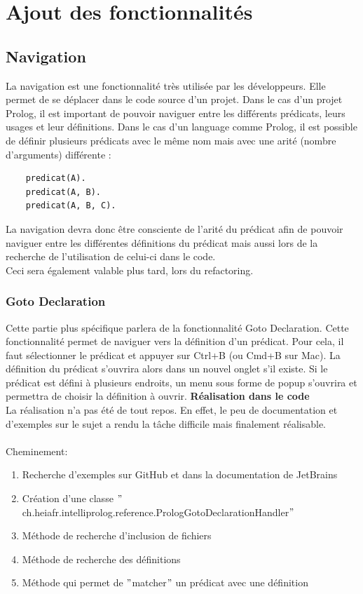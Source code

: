 \chapter{Ajout des fonctionnalités}


\section{Navigation}
\noindent La navigation est une fonctionnalité très utilisée par les développeurs.
Elle permet de se déplacer dans le code source d'un projet.
Dans le cas d'un projet Prolog, il est important de pouvoir naviguer entre les différents prédicats, leurs usages et leur définitions.
\newdoubleline
Dans le cas d'un language comme Prolog, il est possible de définir plusieurs prédicats avec le même nom mais avec une arité (nombre d'arguments) différente :

\begin{lstlisting}
    predicat(A).
    predicat(A, B).
    predicat(A, B, C).
\end{lstlisting}

La navigation devra donc être consciente de l'arité du prédicat afin de pouvoir naviguer entre les différentes définitions du prédicat mais aussi lors de la recherche de l'utilisation de celui-ci dans le code.
\\ Ceci sera également valable plus tard, lors du refactoring.

\subsection{Goto Declaration}
\noindent Cette partie plus spécifique parlera de la fonctionnalité Goto Declaration.
Cette fonctionnalité permet de naviguer vers la définition d'un prédicat.
Pour cela, il faut sélectionner le prédicat et appuyer sur Ctrl+B (ou Cmd+B sur Mac).
La définition du prédicat s'ouvrira alors dans un nouvel onglet s'il existe.
Si le prédicat est défini à plusieurs endroits, un menu sous forme de popup s'ouvrira et permettra de choisir la définition à ouvrir.
\newdoubleline
\noindent \textbf{Réalisation dans le code}
\\
\noindent La réalisation n'a pas été de tout repos.
En effet, le peu de documentation et d'exemples sur le sujet a rendu la tâche difficile mais finalement réalisable.
\\
\\

\noindent Cheminement:
\begin{enumerate}
    \item Recherche d'exemples sur GitHub et dans la documentation de JetBrains
    \item Création d'une classe \("\)ch.heiafr.intelliprolog.reference.PrologGotoDeclarationHandler\("\)
    \item Méthode de recherche d'inclusion de fichiers
    \item Méthode de recherche des définitions
    \item Méthode qui permet de \("\)matcher\("\) un prédicat avec une définition
\end{enumerate}

